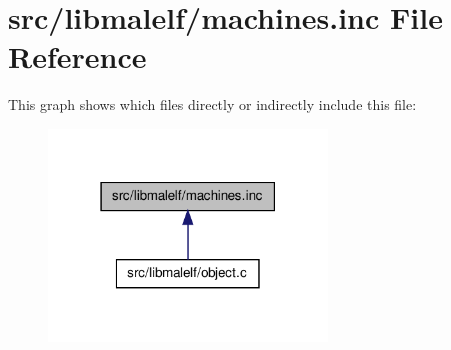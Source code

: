 \hypertarget{machines_8inc}{
\section{src/libmalelf/machines.inc File Reference}
\label{machines_8inc}
}
This graph shows which files directly or indirectly include this file:\nopagebreak
\begin{figure}[H]
\begin{center}
\leavevmode
\includegraphics[width=210pt]{machines_8inc__dep__incl}
\end{center}
\end{figure}
